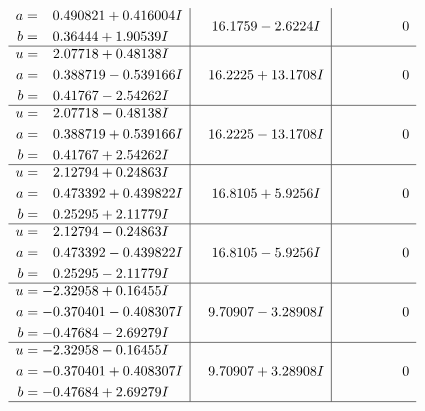 \documentclass[1p]{elsarticle_modified}
\theoremstyle{definition}
\begin{document}
$$\begin{array}{c|c|c}
\begin{aligned}
a &= \phantom{-}0.490821 + 0.416004 I \\
b &= \phantom{-}0.36444 + 1.90539 I\end{aligned}
 & \phantom{-}16.1759 - 2.6224 I & \phantom{-0.000000 } 0 \\ \hline\begin{aligned}
u &= \phantom{-}2.07718 + 0.48138 I \\
a &= \phantom{-}0.388719 - 0.539166 I \\
b &= \phantom{-}0.41767 - 2.54262 I\end{aligned}
 & \phantom{-}16.2225 + 13.1708 I & \phantom{-0.000000 } 0 \\ \hline\begin{aligned}
u &= \phantom{-}2.07718 - 0.48138 I \\
a &= \phantom{-}0.388719 + 0.539166 I \\
b &= \phantom{-}0.41767 + 2.54262 I\end{aligned}
 & \phantom{-}16.2225 - 13.1708 I & \phantom{-0.000000 } 0 \\ \hline\begin{aligned}
u &= \phantom{-}2.12794 + 0.24863 I \\
a &= \phantom{-}0.473392 + 0.439822 I \\
b &= \phantom{-}0.25295 + 2.11779 I\end{aligned}
 & \phantom{-}16.8105 + 5.9256 I & \phantom{-0.000000 } 0 \\ \hline\begin{aligned}
u &= \phantom{-}2.12794 - 0.24863 I \\
a &= \phantom{-}0.473392 - 0.439822 I \\
b &= \phantom{-}0.25295 - 2.11779 I\end{aligned}
 & \phantom{-}16.8105 - 5.9256 I & \phantom{-0.000000 } 0 \\ \hline\begin{aligned}
u &= -2.32958 + 0.16455 I \\
a &= -0.370401 - 0.408307 I \\
b &= -0.47684 - 2.69279 I\end{aligned}
 & \phantom{-}9.70907 - 3.28908 I & \phantom{-0.000000 } 0 \\ \hline\begin{aligned}
u &= -2.32958 - 0.16455 I \\
a &= -0.370401 + 0.408307 I \\
b &= -0.47684 + 2.69279 I\end{aligned}
 & \phantom{-}9.70907 + 3.28908 I & \phantom{-0.000000 } 0\\
 \hline 
 \end{array}$$\newpage\newpage\renewcommand{\arraystretch}{1}
\end{document}
